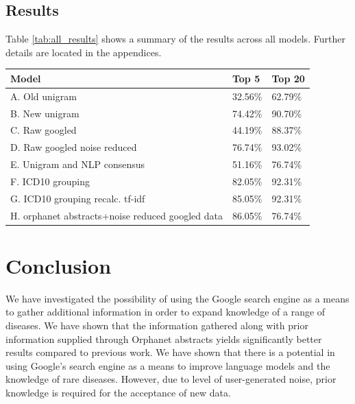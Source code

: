 \documentclass[10pt,letterpaper,two column,final]{article}
\begin{document}


\subsection{Results}
\label{subchap:results}
Table \ref{tab:all_results} shows a summary of the results across all
models. Further details are located in the appendices.
\begin{center}
	\begin{tabular}{p{4cm}|l|l}
		Model & Top 5 & Top 20 \\ \hline
		A. Old unigram & 32.56\% & 62.79\% \\
		B. New unigram & 74.42\% & 90.70\% \\
		C. Raw googled & 44.19\% & 88.37\% \\
		D. Raw googled noise reduced & 76.74\% & 93.02\% \\
		E. Unigram and NLP consensus & 51.16\% & 76.74\% \\
		F. ICD10 grouping & 82.05\% & 92.31\% \\
		G. ICD10 grouping recalc. tf-idf & 85.05\% & 92.31\% \\
		H. orphanet abstracts+noise reduced googled data & 86.05\% & 76.74\% \\
	\end{tabular}
	\label{tab:all_results}
\end{center}

\section{Conclusion}
\label{chap:conclusion}
We have investigated the possibility of using the Google search engine
as a means to gather additional information in order to expand knowledge
of a range of diseases. We have shown that the information gathered
along with prior information supplied through Orphanet abstracts yields
significantly better results compared to previous work. We have shown
that there is a potential in using Google's search engine as a means to
improve language models and the knowledge of rare diseases. However, due to level of
user-generated noise, prior knowledge is required for the acceptance of new data.
\end{document}
